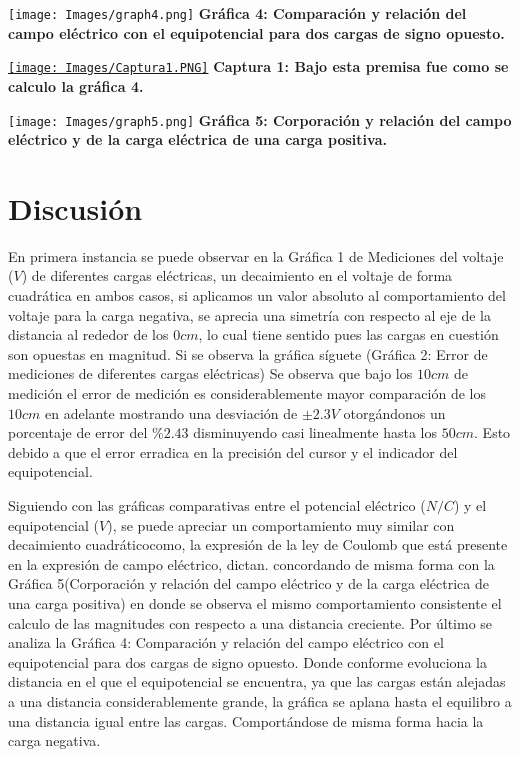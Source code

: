 \documentclass[a4paper,10pt]{article}
\begin{document}
\begin{multicols}{2}
\begin{center}
    \texttt{[image: Images/graph4.png]}
    \textcolor{MiColor2}{\textbf{Gráfica 4: Comparación y relación del campo eléctrico con el equipotencial para dos cargas de signo opuesto.}}
\end{center}

\begin{center}
   \href{https://www.youtube.com/watch?v=dQw4w9WgXcQ}{\texttt{[image: Images/Captura1.PNG]}}
    \textcolor{MiColor2}{\textbf{Captura 1: Bajo esta premisa fue como se calculo la gráfica 4.}}
\end{center}

\begin{center}
    \texttt{[image: Images/graph5.png]}
    \textcolor{MiColor2}{\textbf{Gráfica 5: Corporación y relación del campo eléctrico y de la carga eléctrica de una carga positiva.}}
\end{center}
\section{\textcolor{MiColor1}{\textbf{Discusión}}}
En primera instancia se puede observar en la Gráfica 1 de Mediciones del voltaje ($V$) de diferentes cargas eléctricas, un decaimiento en el voltaje de forma cuadrática en ambos casos, si aplicamos un valor absoluto al comportamiento del voltaje para la carga negativa, se aprecia una simetría con respecto al eje de la distancia al rededor de los $0 cm$, lo cual tiene sentido pues las cargas en cuestión son opuestas en magnitud. Si se observa la gráfica síguete (Gráfica 2: Error de mediciones de diferentes cargas eléctricas) Se observa que bajo los $10 cm$ de medición el error de medición es considerablemente mayor comparación de los $10 cm$ en adelante mostrando una desviación de $\pm{2.3 V}$  otorgándonos un porcentaje de error del $\%2.43$ disminuyendo casi linealmente hasta los $50cm$. Esto debido a que el error erradica en la precisión del cursor y el indicador del equipotencial. \par
Siguiendo con las gráficas comparativas entre el potencial eléctrico ($N/C$) y el equipotencial ($V$), se puede apreciar un comportamiento muy similar con decaimiento cuadráticocomo, la expresión de la ley de Coulomb que está presente en la expresión de campo eléctrico, dictan. concordando de misma forma con la Gráfica 5(Corporación y relación del campo eléctrico y de la carga eléctrica de una carga positiva) en donde se observa  el mismo comportamiento consistente el calculo de las magnitudes con respecto a una distancia creciente. Por último se analiza la Gráfica 4: Comparación y relación del campo eléctrico con el equipotencial para dos cargas de signo opuesto. Donde conforme evoluciona la distancia en el que el equipotencial se encuentra, ya que las cargas están alejadas a una distancia considerablemente grande, la gráfica se aplana hasta el equilibro a una distancia igual entre las cargas. Comportándose de misma forma hacia la carga negativa. 

\end{multicols}
\end{document}
